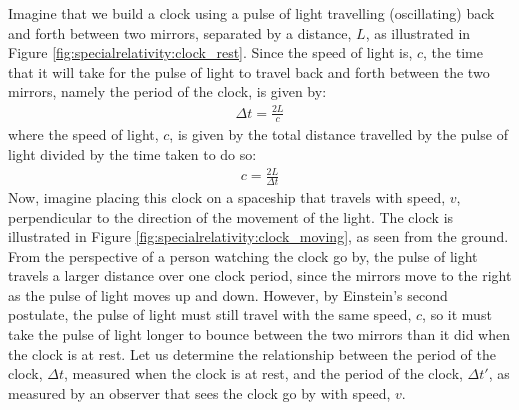 Imagine that we build a clock using a pulse of light travelling (oscillating) back and forth between two mirrors, separated by a distance, $L$, as illustrated in Figure \ref{fig:specialrelativity:clock_rest}.
Since the speed of light is, $c$, the time that it will take for the pulse of light to travel back and forth between the two mirrors, namely the period of the clock, is given by:
\begin{align*}
\Delta t = \frac{2L}{c}
\end{align*}
where the speed of light, $c$, is given by the total distance travelled by the pulse of light divided by the time taken to do so:
\begin{align*}
c=\frac{2L}{\Delta t}
\end{align*}
Now, imagine placing this clock on a spaceship that travels with speed, $v$, perpendicular to the direction of the movement of the light. The clock is illustrated in Figure \ref{fig:specialrelativity:clock_moving}, as seen from the ground.
From the perspective of a person watching the clock go by, the pulse of light travels a larger distance over one clock period, since the mirrors move to the right as the pulse of light moves up and down. However, by Einstein's second postulate, the pulse of light must still travel with the same speed, $c$, so it must take the pulse of light longer to bounce between the two mirrors than it did when the clock is at rest. Let us determine the relationship between the period of the clock, $\Delta t$, measured when the clock is at rest, and the period of the clock, $\Delta t'$, as measured by an observer that sees the clock go by with speed, $v$. 

